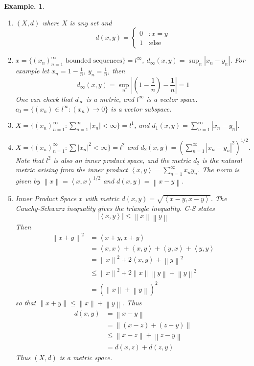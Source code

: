 \documentclass[11pt, a4paper]{memoir}
\newcommand{\norm}[1]{\ensuremath{\left\lVert#1\right\rVert}}
\theoremstyle{change}
\theoremstyle{plain}
\theoremstyle{nonumberplain}
\newtheorem{example}{Example.}
\newcommand{\inner}[2]{\left\langle #1, #2 \right\rangle} %
\numberwithin{equation}{section}
\begin{document}
\begin{example}
\begin{enumerate}
\begin{center}
            \end{center}
        \item $(X,d)$ where $X$ is any set and
            \[d(x,y)=
            \begin{cases}
                0&:x=y\\
                1&:\text{else}
            \end{cases}
            \]
        \item $x=\{(x_n)_{n=1}^\infty\text{ bounded sequences}\}=l^\infty$, $d_\infty(x,y)=\sup_n|x_n-y_n|$.
            For example let $x_n=1-\frac{1}{n}$, $y_n=\frac{1}{n}$, then
            \[d_\infty(x,y)=\sup_n\left|\left( 1-\frac{1}{n} \right)-\frac{1}{n}\right|=1\]
            One can check that $d_\infty$ is a metric, and $l^\infty$ is a vector space. $c_0=\{(x_n)\in l^\infty:(x_n)\to 0\}$
            is a vector subspace.
        \item $X=\{(x_n)_{n=1}^\infty:\sum\limits_{n=1}^\infty |x_n|<\infty\}=l^1$, and $d_1(x,y)=\sum\limits_{n=1}^\infty|x_n-y_n|$.
        \item $X=\{(x_n)_{n=1}^\infty:\sum|x_n|^2<\infty\}=l^2$ and $d_2(x,y)=\left(\sum\limits_{n=1}^\infty|x_n-y_n|^2\right)^{1/2}$.
            Note that $l^2$ is also an inner product space, and the metric $d_2$ is the natural metric arising from the inner
            product $\inner{x}{y}=\sum\limits_{n=1}^\infty x_ny_n$. The norm is given by $\norm{x}=\inner{x}{x}^{1/2}$
            and $d(x,y)=\norm{x-y}$.
        \item Inner Product Space $x$ with metric $d(x,y)=\sqrt{\inner{x-y}{x-y}}$. The Cauchy-Schwarz inequality gives
            the triangle inequality. C-S states
            \[|\inner{x}{y}|\leq\norm{x}\norm{y}\]
            Then
            \begin{align*}
                \norm{x+y}^2&=\inner{x+y}{x+y}\\
                &=\inner{x}{x}+\inner{x}{y}+\inner{y}{x}+\inner{y}{y}\\
                &=\norm{x}^2+2\inner{x}{y}+\norm{y}^2\\
                &\leq\norm{x}^2+2\norm{x}\norm{y}+\norm{y}^2\\
                &=(\norm{x}+\norm{y})^2
            \end{align*}
            so that $\norm{x+y}\leq\norm{x}+\norm{y}$. Thus
            \begin{align*}
                d(x,y)&=\norm{x-y}\\
                &=\norm{(x-z)+(z-y)}\\
                &\leq\norm{x-z}+\norm{z-y}\\
                &=d(x,z)+d(z,y)
            \end{align*}
            Thus $(X,d)$ is a metric space.
    \end{enumerate}
\end{example}
\end{document}
